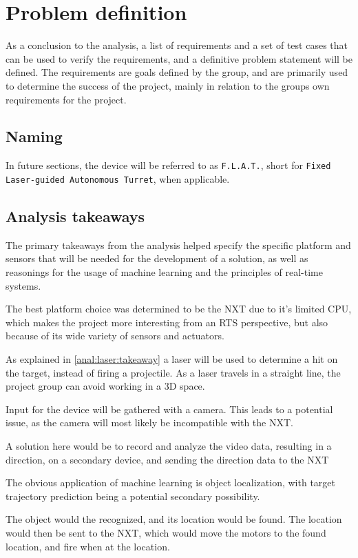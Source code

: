 \newpage
\section{Problem definition}
As a conclusion to the analysis, a list of requirements and a set of test cases that can be used to verify the requirements, and a definitive problem statement will be defined.
The requirements are goals defined by the group, and are primarily used to determine the success of the project, mainly in relation to the groups own requirements for the project.

\subsection{Naming}
In future sections, the device will be referred to as \texttt{F.L.A.T.}, short for \texttt{Fixed Laser-guided Autonomous Turret}, when applicable.

\subsection{Analysis takeaways}
The primary takeaways from the analysis helped specify the specific platform and sensors that will be needed for the development of a solution, as well as reasonings for the usage of machine learning and the principles of real-time systems.

The best platform choice was determined to be the NXT due to it's limited CPU, which makes the project more interesting from an RTS perspective, but also because of its wide variety of sensors and actuators.


As explained in \autoref{anal:laser:takeaway} a laser will be used to determine a hit on the target, instead of firing a projectile.
As a laser travels in a straight line, the project group can avoid working in a 3D space.


Input for the device will be gathered with a camera.
This leads to a potential issue, as the camera will most likely be incompatible with the NXT.

A solution here would be to record and analyze the video data, resulting in a direction, on a secondary device, and sending the direction data to the NXT

The obvious application of machine learning is object localization, with target trajectory prediction being a potential secondary possibility.

The object would the recognized, and its location would be found.
The location would then be sent to the NXT, which would move the motors to the found location, and fire when at the location.


